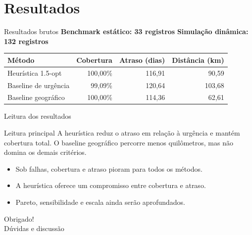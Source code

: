 \documentclass[aspectratio=169]{beamer}
\begin{document}
\section{Resultados}
\begin{frame}{Resultados brutos}
  \centering
  \small
  \textbf{Benchmark estático: 33 registros} \hspace{1em} \textbf{Simulação dinâmica: 132 registros}
  \vspace{0.8em}

  \begin{tabular}{@{}lrrr@{}}
    \toprule
    \textbf{Método} & \textbf{Cobertura} & \textbf{Atraso (dias)} & \textbf{Distância (km)} \\
    \midrule
    Heurística 1.5-opt & 100,00\% & 116,91 & 90,59 \\
    Baseline de urgência & 99,09\% & 120,64 & 103,68 \\
    Baseline geográfico & 100,00\% & 114,36 & 62,61 \\
    \bottomrule
  \end{tabular}
\end{frame}

\begin{frame}{Leitura dos resultados}
  \begin{block}{Leitura principal}
    A heurística reduz o atraso em relação à urgência e mantém cobertura total. O baseline geográfico percorre menos quilômetros, mas não domina os demais critérios.
  \end{block}

  \vspace{0.6em}
  \begin{itemize}
    \item Sob falhas, cobertura e atraso pioram para todos os métodos.
    \item A heurística oferece um compromisso entre cobertura e atraso.
    \item Pareto, sensibilidade e escala ainda serão aprofundados.
  \end{itemize}
\end{frame}

\begin{frame}{}
  \centering
  \vspace{1cm}
  {\Huge Obrigado!}\\[1em]
  {\large Dúvidas e discussão}
\end{frame}
\end{document}
